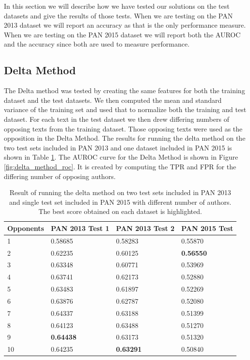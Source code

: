 In this section we will describe how we have tested our solutions on the test
datasets and give the results of those tests. When we are testing on the PAN
2013 dataset we will report an accuracy as that is the only performance measure.
When we are testing on the PAN 2015 dataset we will report both the \gls{AUROC}
and the accuracy since both are used to measure performance.

\subsection{Delta Method} \label{subsec:results:delta_method}
The Delta method was tested by creating the same features for both the training
dataset and the test datasets. We then computed the mean and standard variance
of the training set and used that to normalize both the training and test
dataset. For each text in the test dataset we then drew differing numbers of
opposing texts from the training dataset. Those opposing texts were used as the
opposition in the Delta Method. The results for running the delta method on
the two test sets included in PAN 2013 and one dataset included in PAN 2015 is
shown in Table \ref{tab:delta_method_final_results}. The \gls{AUROC} curve for
the Delta Method is shown in Figure \ref{fig:delta_method_roc}. It is created
by computing the \gls{TPR} and \gls{FPR} for the differing number of opposing
authors.

\begin{table}
    \centering
    \begin{tabular}{l|lll}
        \textbf{Opponents} & \textbf{PAN 2013 Test 1} & \textbf{PAN 2013 Test 2}
        & \textbf{PAN 2015 Test} \\ \hline
        1  & 0.58685 & 0.58283 & 0.55870 \\
        2  & 0.62235 & 0.60125 & \textbf{0.56550} \\
        3  & 0.63348 & 0.60771 & 0.53969 \\
        4  & 0.63741 & 0.62173 & 0.52880 \\
        5  & 0.63483 & 0.61897 & 0.52269 \\
        6  & 0.63876 & 0.62787 & 0.52080 \\
        7  & 0.64337 & 0.63188 & 0.51399 \\
        8  & 0.64123 & 0.63488 & 0.51270 \\
        9  & \textbf{0.64438} & 0.63173 & 0.51320 \\
        10 & 0.64235 & \textbf{0.63291} & 0.50840
    \end{tabular}
    \caption{Result of running the delta method on two test sets included in PAN
    2013 and single test set included in PAN 2015 with different number of
    authors. The best score obtained on each dataset is highlighted.}
    \label{tab:delta_method_final_results}
\end{table}

